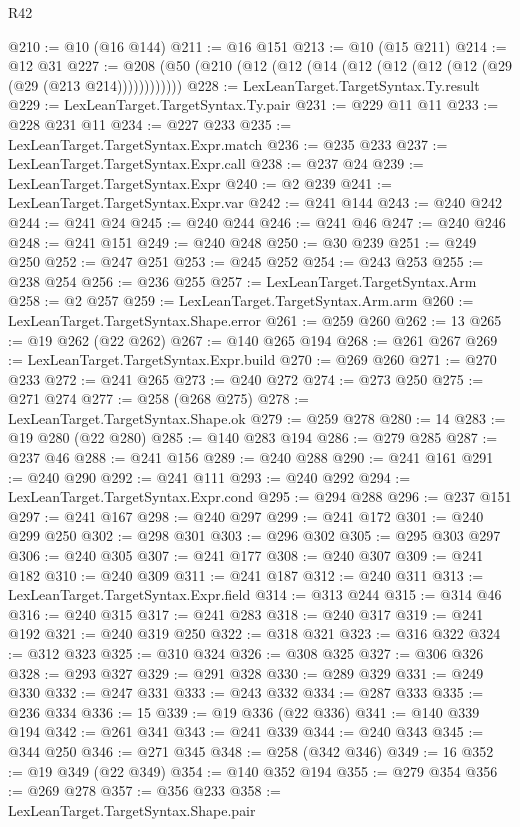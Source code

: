 \begin{lexlean}{R42}
\begin{coremodule}
@210 := @10 (@16 @144)
@211 := @16 @151
@213 := @10 (@15 @211)
@214 := @12 @31
@227 := @208 (@50 (@210 (@12 (@12 (@14 (@12 (@12 (@12 (@12 (@29 (@29 (@213 @214))))))))))))
@228 := LexLeanTarget.TargetSyntax.Ty.result
@229 := LexLeanTarget.TargetSyntax.Ty.pair
@231 := @229 @11 @11
@233 := @228 @231 @11
@234 := @227 @233
@235 := LexLeanTarget.TargetSyntax.Expr.match
@236 := @235 @233
@237 := LexLeanTarget.TargetSyntax.Expr.call
@238 := @237 @24
@239 := LexLeanTarget.TargetSyntax.Expr
@240 := @2 @239
@241 := LexLeanTarget.TargetSyntax.Expr.var
@242 := @241 @144
@243 := @240 @242
@244 := @241 @24
@245 := @240 @244
@246 := @241 @46
@247 := @240 @246
@248 := @241 @151
@249 := @240 @248
@250 := @30 @239
@251 := @249 @250
@252 := @247 @251
@253 := @245 @252
@254 := @243 @253
@255 := @238 @254
@256 := @236 @255
@257 := LexLeanTarget.TargetSyntax.Arm
@258 := @2 @257
@259 := LexLeanTarget.TargetSyntax.Arm.arm
@260 := LexLeanTarget.TargetSyntax.Shape.error
@261 := @259 @260
@262 := 13
@265 := @19 @262 (@22 @262)
@267 := @140 @265 @194
@268 := @261 @267
@269 := LexLeanTarget.TargetSyntax.Expr.build
@270 := @269 @260
@271 := @270 @233
@272 := @241 @265
@273 := @240 @272
@274 := @273 @250
@275 := @271 @274
@277 := @258 (@268 @275)
@278 := LexLeanTarget.TargetSyntax.Shape.ok
@279 := @259 @278
@280 := 14
@283 := @19 @280 (@22 @280)
@285 := @140 @283 @194
@286 := @279 @285
@287 := @237 @46
@288 := @241 @156
@289 := @240 @288
@290 := @241 @161
@291 := @240 @290
@292 := @241 @111
@293 := @240 @292
@294 := LexLeanTarget.TargetSyntax.Expr.cond
@295 := @294 @288
@296 := @237 @151
@297 := @241 @167
@298 := @240 @297
@299 := @241 @172
@301 := @240 @299 @250
@302 := @298 @301
@303 := @296 @302
@305 := @295 @303 @297
@306 := @240 @305
@307 := @241 @177
@308 := @240 @307
@309 := @241 @182
@310 := @240 @309
@311 := @241 @187
@312 := @240 @311
@313 := LexLeanTarget.TargetSyntax.Expr.field
@314 := @313 @244
@315 := @314 @46
@316 := @240 @315
@317 := @241 @283
@318 := @240 @317
@319 := @241 @192
@321 := @240 @319 @250
@322 := @318 @321
@323 := @316 @322
@324 := @312 @323
@325 := @310 @324
@326 := @308 @325
@327 := @306 @326
@328 := @293 @327
@329 := @291 @328
@330 := @289 @329
@331 := @249 @330
@332 := @247 @331
@333 := @243 @332
@334 := @287 @333
@335 := @236 @334
@336 := 15
@339 := @19 @336 (@22 @336)
@341 := @140 @339 @194
@342 := @261 @341
@343 := @241 @339
@344 := @240 @343
@345 := @344 @250
@346 := @271 @345
@348 := @258 (@342 @346)
@349 := 16
@352 := @19 @349 (@22 @349)
@354 := @140 @352 @194
@355 := @279 @354
@356 := @269 @278
@357 := @356 @233
@358 := LexLeanTarget.TargetSyntax.Shape.pair

\end{coremodule}
\end{lexlean}
